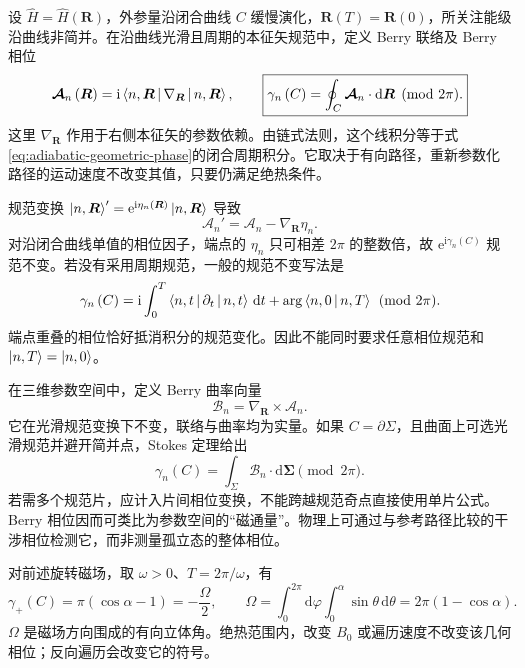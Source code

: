 设 $\hat H=\hat H\left(\bm R\right)$，外参量沿闭合曲线 $C$ 缓慢演化，$\bm R\left(T\right)=\bm R\left(0\right)$，所关注能级沿曲线非简并。在沿曲线光滑且周期的本征矢规范中，定义 Berry 联络及 Berry 相位
\begin{equation}
\bm{\mathcal A}_n\left(\bm R\right)=\mathrm{i}\Braket{n,\bm R|\nabla_{\bm R}|n,\bm R},\qquad
\boxed{\gamma_n\left(C\right)=\oint_C\bm{\mathcal A}_n\cdot\mathrm{d}\bm R
\pmod{2\pi}.}
\end{equation}
这里 $\nabla_{\bm R}$ 作用于右侧本征矢的参数依赖。由链式法则，这个线积分等于式\eqref{eq:adiabatic-geometric-phase}的闭合周期积分。它取决于有向路径，重新参数化路径的运动速度不改变其值，只要仍满足绝热条件。

规范变换 $\Ket{n,\bm R}'=\mathrm{e}^{\mathrm{i}\eta_n\left(\bm R\right)}\Ket{n,\bm R}$ 导致
\begin{equation}
\bm{\mathcal A}_n'=\bm{\mathcal A}_n-\nabla_{\bm R}\eta_n.
\end{equation}
对沿闭合曲线单值的相位因子，端点的 $\eta_n$ 只可相差 $2\pi$ 的整数倍，故 $\mathrm{e}^{\mathrm{i}\gamma_n\left(C\right)}$ 规范不变。若没有采用周期规范，一般的规范不变写法是
\begin{equation}
\gamma_n\left(C\right)=\mathrm{i}\int_0^T\Braket{n,t|\partial_t|n,t}\,\mathrm{d}t
+\arg\Braket{n,0|n,T}\pmod{2\pi}.
\end{equation}
端点重叠的相位恰好抵消积分的规范变化。因此不能同时要求任意相位规范和 $\Ket{n,T}=\Ket{n,0}$。

在三维参数空间中，定义 Berry 曲率向量
\begin{equation}
\bm{\mathcal B}_n=\nabla_{\bm R}\times\bm{\mathcal A}_n.
\end{equation}
它在光滑规范变换下不变，联络与曲率均为实量。如果 $C=\partial\Sigma$，且曲面上可选光滑规范并避开简并点，Stokes 定理给出
\begin{equation}
\gamma_n\left(C\right)=\int_\Sigma\bm{\mathcal B}_n\cdot\mathrm{d}\bm\Sigma\pmod{2\pi}.
\end{equation}
若需多个规范片，应计入片间相位变换，不能跨越规范奇点直接使用单片公式。Berry 相位因而可类比为参数空间的“磁通量”。物理上可通过与参考路径比较的干涉相位检测它，而非测量孤立态的整体相位。

对前述旋转磁场，取 $\omega>0$、$T=2\pi/\omega$，有
\begin{equation}
\gamma_+\left(C\right)=\pi\left(\cos\alpha-1\right)=-\frac\Omega2,\qquad
\Omega=\int_0^{2\pi}\!\mathrm{d}\varphi\int_0^\alpha\sin\theta\,\mathrm{d}\theta
=2\pi\left(1-\cos\alpha\right).
\end{equation}
$\Omega$ 是磁场方向围成的有向立体角。绝热范围内，改变 $B_0$ 或遍历速度不改变该几何相位；反向遍历会改变它的符号。

